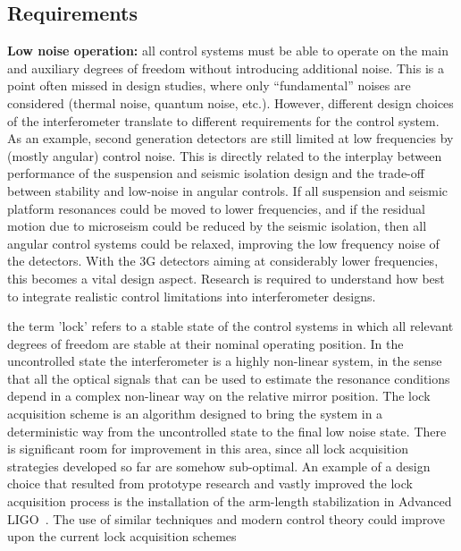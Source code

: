 \subsection{Requirements}
{\bf Low noise operation:} all control systems must be able to operate on the main and auxiliary degrees of freedom without introducing additional noise. 
This is a point often missed in design studies, where only ``fundamental'' noises are considered (thermal noise, quantum noise, etc.). However, different design choices of the interferometer translate to different requirements for the control system. As an example, second generation detectors are still limited at low frequencies by (mostly angular) control noise. 
This is directly related to the interplay between performance of the suspension and seismic isolation design and the trade-off between stability and low-noise in angular controls. 
If all suspension and seismic platform resonances could be moved to lower frequencies, and if the residual motion due to microseism could be reduced by the seismic isolation, then all angular control systems could be relaxed, improving the low frequency noise of the detectors. 
With the 3G detectors aiming at considerably lower frequencies, this becomes a vital design aspect. Research is required to understand how best to integrate realistic control limitations into interferometer designs.\par
{} the term 'lock' refers to a stable state of the control systems in which all relevant degrees of freedom are stable at their nominal operating position. In the uncontrolled state the interferometer is a highly non-linear system, in the sense that all the optical signals that can be used to estimate the resonance conditions depend in a complex non-linear way on the relative mirror position. The lock acquisition scheme is an algorithm designed to bring the system in a deterministic way from the uncontrolled state to the final low noise state. There is significant room for improvement in this area, since all lock acquisition strategies developed so far are somehow sub-optimal. An example of a design choice that resulted from prototype research and vastly improved the lock acquisition process is the installation of the arm-length stabilization in Advanced LIGO~\cite{Mullavey:12}. The use of similar techniques and modern control theory could improve upon the current lock acquisition schemes
